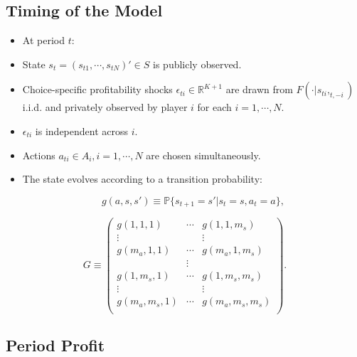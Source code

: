 \documentclass[]{book}
\providecommand{\tightlist}{%
  \setlength{\itemsep}{0pt}\setlength{\parskip}{0pt}}
\begin{document}
\subsection{Timing of the Model}\label{timing-of-the-model-1}

\begin{itemize}
\tightlist
\item
  At period \(t\):
\item
  State \(s_t = (s_{t1}, \cdots, s_{tN})' \in S\) is publicly observed.
\item
  Choice-specific profitability shocks
  \(\epsilon_{ti} \in \mathbb{R}^{K + 1}\) are drawn from
  \(F(\cdot|s_{ti}, _{t,-i})\) i.i.d. and privately observed by player
  \(i\) for each \(i = 1, \cdots, N\).
\item
  \(\epsilon_{ti}\) is independent across \(i\).
\item
  Actions \(a_{ti} \in A_i, i = 1, \cdots, N\) are chosen
  simultaneously.
\item
  The state evolves according to a transition probability:

  \begin{equation}
  g(a, s, s') \equiv \mathbb{P}\{s_{t + 1} = s'|s_t = s, a_t = a\},
  \end{equation}
\end{itemize}

\begin{equation}
G \equiv 
\begin{pmatrix}
g(1, 1, 1) & \cdots & g(1, 1, m_s)\\
\vdots & & \vdots \\
g(m_a, 1, 1) & \cdots & g(m_a, 1, m_s)\\
&\vdots& \\
g(1, m_s, 1) & \cdots & g(1, m_s, m_s)\\
\vdots & & \vdots \\
g(m_a, m_s, 1) & \cdots & g(m_a, m_s, m_s)\\
\end{pmatrix}.
\end{equation}

\subsection{Period Profit}\label{period-profit}
\end{document}
